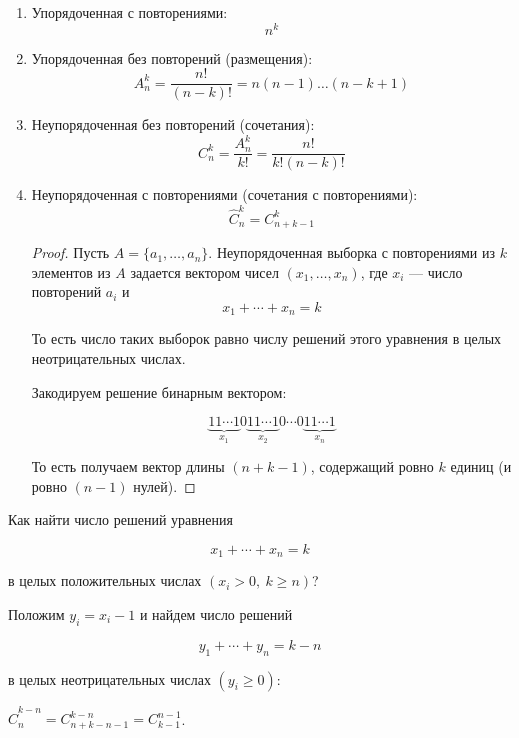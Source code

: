\begin{enumerate}
    \item Упорядоченная с повторениями: 
    \[ n^k \]
    
    \item Упорядоченная без повторений (размещения): 
    \[ A_n^k = \frac{n!}{(n - k)!} = n(n-1) \ldots (n - k + 1) \]
    
    \item Неупорядоченная без повторений (сочетания):
    \[ C_n^k = \frac{A_n^k}{k!} = \frac{n!}{k!(n - k)!} \]
    
    \item Неупорядоченная с повторениями (сочетания с повторениями):
    \[ \hat{C}_n^k = C_{n + k - 1}^k \]
    \begin{proof}
        Пусть $A = \{a_1, \ldots, a_n\}$. Неупорядоченная выборка с повторениями из $k$ элементов из $A$ задается вектором чисел $(x_1, \ldots, x_n)$, где $x_i$ --- число повторений $a_i$ и 
        \[ x_1 + \cdots + x_n = k \]
        
        То есть число таких выборок равно числу решений этого уравнения в целых неотрицательных числах.

        Закодируем решение бинарным вектором:

        \[ \underbrace{11 \cdots 1}_{x_1} 0 \underbrace{11 \cdots 1}_{x_2} 0 \cdots 0 \underbrace{11 \cdots 1}_{x_n} \]

        То есть получаем вектор длины $(n + k - 1)$, содержащий ровно $k$ единиц (и ровно $(n - 1)$ нулей).
    \end{proof}
\end{enumerate}

Как найти число решений уравнения 

\[ x_1 + \cdots + x_n = k \]

в целых положительных числах $(x_i > 0,~k \geq n)$?

Положим $y_i = x_i - 1$ и найдем число решений

\[ y_1 + \cdots + y_n = k - n \]

в целых неотрицательных числах $(y_i \geq 0)$:

$\hat{C}_n^{k-n} = C_{n + k - n - 1}^{k-n} = C_{k-1}^{n-1}$.